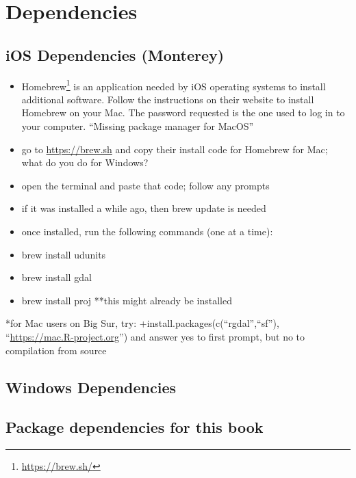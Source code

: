 \documentclass[
  krantz2]{krantz}
\begin{document}
\cleardoublepage

\hypertarget{appendix-appendix}{%
\appendix {}}


\hypertarget{dependencies}{%
\chapter{Dependencies}\label{dependencies}}

\hypertarget{ios-dependencies-monterey}{%
\section{iOS Dependencies (Monterey)}\label{ios-dependencies-monterey}}

\begin{itemize}
\item
  Homebrew\footnote{\url{https://brew.sh/}} is an application needed by iOS operating systems to install additional software. Follow the instructions on their website to install Homebrew on your Mac. The password requested is the one used to log in to your computer. ``Missing package manager for MacOS''
\item
  go to \url{https://brew.sh} and copy their install code for Homebrew for Mac; what do you do for Windows?
\item
  open the terminal and paste that code; follow any prompts
\item
  if it was installed a while ago, then brew update is needed
\item
  once installed, run the following commands (one at a time):
\item
  brew install udunits
\item
  brew install gdal
\item
  brew install proj **this might already be installed
\end{itemize}

*for Mac users on Big Sur, try:
+install.packages(c(``rgdal'',``sf''), ``\url{https://mac.R-project.org}'') and answer yes to first prompt, but no to compilation from source

\hypertarget{windows-dependencies}{%
\section{Windows Dependencies}\label{windows-dependencies}}

\hypertarget{package-dependencies-for-this-book}{%
\section{Package dependencies for this book}\label{package-dependencies-for-this-book}}
\end{document}
